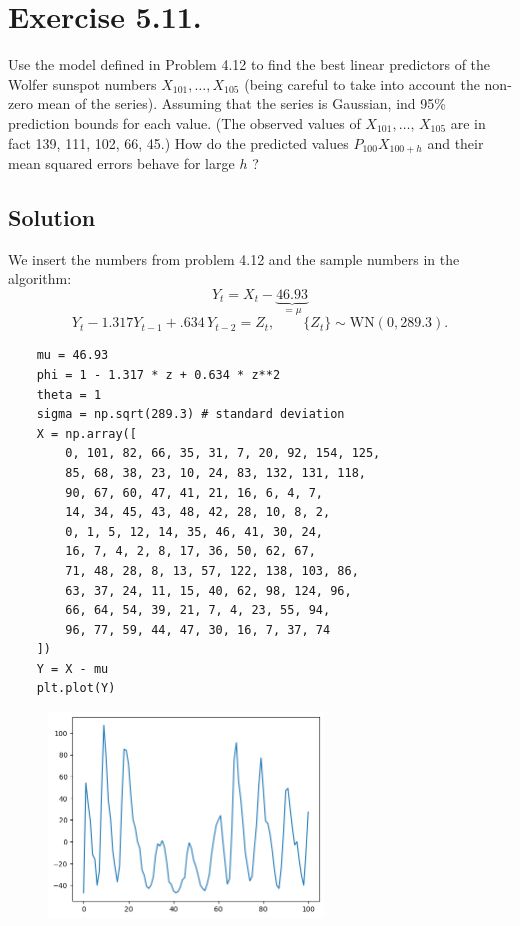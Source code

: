 \section*{Exercise 5.11.}

Use the model defined in Problem 4.12 to find the best linear predictors of the Wolfer sunspot numbers $X_{1 0 1}, \ldots, X_{1 0 5}$ (being careful to take into account the non-zero mean of the series). Assuming that the series is Gaussian, ind 95\% prediction bounds for each value. (The observed values of $X_{1 0 1}, \ldots, \, X_{1 0 5}$ are in fact 139, 111, 102, 66, 45.) How do the predicted values $P_{1 0 0} X_{1 0 0+h}$ and their mean squared errors behave for large $h$ ?


\subsection*{Solution}

We insert the numbers from problem 4.12 and the sample numbers in the algorithm:
\[ Y_t = X_t - \underbrace{46.93}_{= \mu} \]
\[ Y_{t}-1.317Y_{t-1}+.634\,Y_{t-2}=Z_{t},\qquad\{Z_{t}\}\sim\mathrm{WN}(0,289.3). \]
\begin{verbatim}
    mu = 46.93
    phi = 1 - 1.317 * z + 0.634 * z**2
    theta = 1
    sigma = np.sqrt(289.3) # standard deviation
    X = np.array([
        0, 101, 82, 66, 35, 31, 7, 20, 92, 154, 125,
        85, 68, 38, 23, 10, 24, 83, 132, 131, 118,
        90, 67, 60, 47, 41, 21, 16, 6, 4, 7, 
        14, 34, 45, 43, 48, 42, 28, 10, 8, 2,
        0, 1, 5, 12, 14, 35, 46, 41, 30, 24,
        16, 7, 4, 2, 8, 17, 36, 50, 62, 67,
        71, 48, 28, 8, 13, 57, 122, 138, 103, 86,
        63, 37, 24, 11, 15, 40, 62, 98, 124, 96,
        66, 64, 54, 39, 21, 7, 4, 23, 55, 94,
        96, 77, 59, 44, 47, 30, 16, 7, 37, 74
    ])
    Y = X - mu
    plt.plot(Y)
\end{verbatim}

\begin{figure}[H]
    \centering
    \includegraphics[width=0.65\textwidth]{../pictures/image1.png}
\end{figure}

